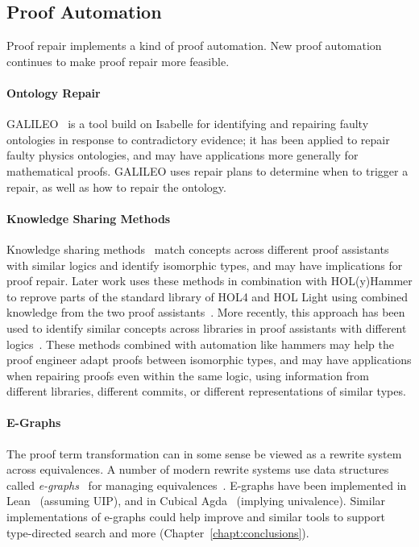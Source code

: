 \subsection{Proof Automation}
\label{sec:automation}

Proof repair implements a kind of proof automation.
New proof automation continues to make proof repair more feasible.

\paragraph{Ontology Repair}
GALILEO~\cite{chan2011galileo} is a tool build on Isabelle for identifying and repairing faulty ontologies in response to contradictory
evidence; it has been applied to repair faulty physics ontologies, and may have applications more generally for mathematical proofs.
GALILEO uses repair plans to determine when to trigger a repair, as well as how to repair the ontology.

\paragraph{Knowledge Sharing Methods}
Knowledge sharing methods~\cite{gauthier2014} match concepts across
different proof assistants with similar logics and identify isomorphic types,
and may have implications for proof repair.
Later work uses these methods in combination with HOL(y)Hammer to
reprove parts of the standard library of HOL4 and HOL Light using combined knowledge 
from the two proof assistants~\cite{Gauthier2015}. 
More recently, this approach has been used to identify similar concepts
across libraries in proof assistants with different logics~\cite{gauthier2017}.
These methods combined with automation like hammers may help the proof engineer 
adapt proofs between isomorphic types, and may have applications
when repairing proofs even within the same logic, using information from different 
libraries, different commits, or different representations of similar types.

\paragraph{E-Graphs} %
The \toolnamec proof term transformation can in some sense be viewed as a rewrite system across equivalences.
A number of modern rewrite systems use data structures called \textit{e-graphs}~\cite{egraph1} for managing equivalences~\cite{egg}.
E-graphs have been implemented in Lean~\cite{selsam:lean} (assuming UIP),
and in Cubical Agda~\cite{egraph6} (implying univalence).
Similar implementations of e-graphs could help improve \toolnamec and similar tools to support
type-directed search and more (Chapter~\ref{chapt:conclusions}).


